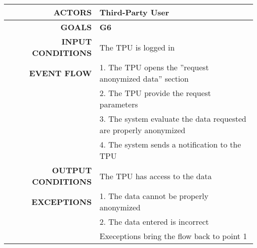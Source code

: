 \begin{table}[h!]
\begin{tabular}{|r|p{3in}|}
\hline
\textbf{ACTORS} & Third-Party User\\
\hline
\textbf{GOALS} & \textbf{G6}\\
\hline
\textbf{INPUT CONDITIONS} & The TPU is logged in\\
\hline
\textbf{EVENT FLOW} 
&1. The TPU opens the ''request anonymized data'' section \\
&2. The TPU provide the request parameters \\
&3. The system evaluate the data requested are properly anonymized\\
&4. The system sends a notification to the TPU \\
\hline
\textbf{OUTPUT CONDITIONS} & The TPU has access to the data \\
\hline
\textbf{EXCEPTIONS} 
&1. The data cannot be properly anonymized \\
&2. The data entered is incorrect\\
&Execeptions bring the flow back to point 1 \\
\hline
\end{tabular}
\end{table}